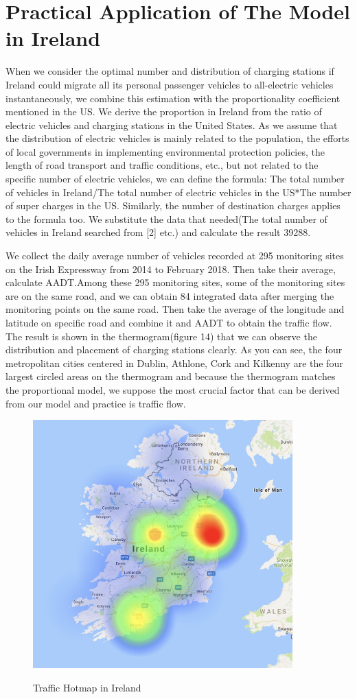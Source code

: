 \documentclass{mcmthesis}
\begin{document}
\section{Practical Application of The Model in Ireland}
When we consider the optimal number and distribution of charging stations if Ireland could migrate all its personal passenger vehicles to all-electric vehicles instantaneously, we combine this estimation with the proportionality coefficient mentioned in the US. We derive the proportion in Ireland from the ratio of electric vehicles and charging stations in the United States. As we assume that the distribution of electric vehicles is mainly related to the population, the efforts of local governments in implementing environmental protection policies, the length of road transport and traffic conditions, etc., but not related to the specific number of electric vehicles, we can define the formula: The total number of vehicles in Ireland/The total number of electric vehicles in the US*The number of super charges in the US. Similarly, the number of destination charges applies to the formula too. We substitute the data that needed(The total number of vehicles in Ireland searched from [2] etc.) and calculate the result 39288.

We collect the daily average number of vehicles recorded at 295 monitoring sites on the Irish Expressway from 2014 to February 2018. Then take their average, calculate AADT.Among these 295 monitoring sites, some of the monitoring sites are on the same road, and we can obtain 84 integrated data after merging the monitoring points on the same road. Then take the average of the  longitude and latitude on specific road and combine it and AADT to obtain the traffic flow. The result is shown in the thermogram(figure 14) that we can observe the distribution and placement of charging stations clearly. As you can see, the four metropolitan cities centered in Dublin, Athlone, Cork and Kilkenny are the four largest circled areas on the thermogram and because the thermogram matches the proportional model, we suppose the most crucial factor that can be derived from our model and practice is traffic flow.
 \begin{figure}[htbp]
	\centering
	\includegraphics[width=10cm]{img/monheat.png}\\
	\caption{Traffic Hotmap in Ireland}
	\label{Figure7}
\end{figure}
\end{document}
